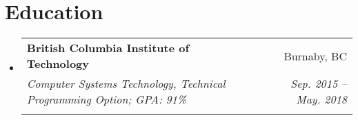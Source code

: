 \documentclass[letterpaper,11pt]{article}
\makeatletter
\newcommand{\resumeSubheading}[6]{
  \vspace{-1pt}\item
    \begin{tabular*}{0.97\textwidth}{l@{\extracolsep{\fill}}r}
      \textbf{#1} & #2 \\
      \textit{\small#3} & \textit{\small #4} \\
      \textbf{\textit{\small#5}} & \small#6
    \end{tabular*}\vspace{-5pt}
}
\newcommand{\resumeSubHeadingListStart}{\begin{itemize}[leftmargin=*]}
\newcommand{\resumeSubHeadingListEnd}{\end{itemize}}
\makeatother
\begin{document}
\section{Education}
  \resumeSubHeadingListStart
    \resumeSubheading
      {British Columbia Institute of Technology}{Burnaby, BC}
      {Computer Systems Technology, Technical Programming Option;  GPA: 91\%}{Sep. 2015 -- May. 2018}
      {}{}
  \resumeSubHeadingListEnd


\end{document}
